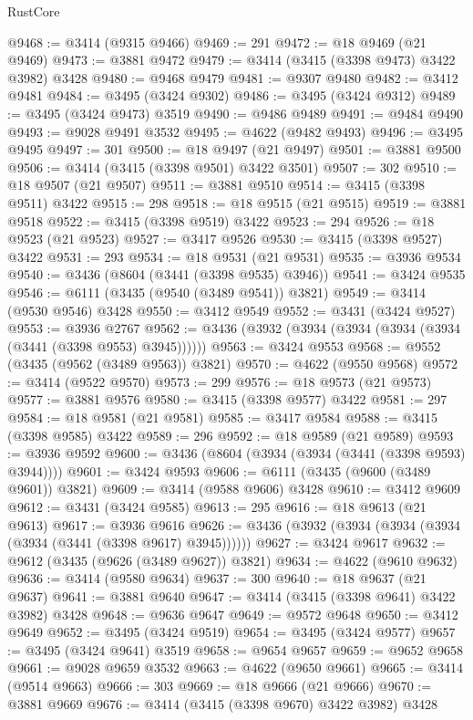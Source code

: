 \begin{lexlean}{RustCore}
\begin{coremodule}
@9468 := @3414 (@9315 @9466)
@9469 := 291
@9472 := @18 @9469 (@21 @9469)
@9473 := @3881 @9472
@9479 := @3414 (@3415 (@3398 @9473) @3422 @3982) @3428
@9480 := @9468 @9479
@9481 := @9307 @9480
@9482 := @3412 @9481
@9484 := @3495 (@3424 @9302)
@9486 := @3495 (@3424 @9312)
@9489 := @3495 (@3424 @9473) @3519
@9490 := @9486 @9489
@9491 := @9484 @9490
@9493 := @9028 @9491 @3532
@9495 := @4622 (@9482 @9493)
@9496 := @3495 @9495
@9497 := 301
@9500 := @18 @9497 (@21 @9497)
@9501 := @3881 @9500
@9506 := @3414 (@3415 (@3398 @9501) @3422 @3501)
@9507 := 302
@9510 := @18 @9507 (@21 @9507)
@9511 := @3881 @9510
@9514 := @3415 (@3398 @9511) @3422
@9515 := 298
@9518 := @18 @9515 (@21 @9515)
@9519 := @3881 @9518
@9522 := @3415 (@3398 @9519) @3422
@9523 := 294
@9526 := @18 @9523 (@21 @9523)
@9527 := @3417 @9526
@9530 := @3415 (@3398 @9527) @3422
@9531 := 293
@9534 := @18 @9531 (@21 @9531)
@9535 := @3936 @9534
@9540 := @3436 (@8604 (@3441 (@3398 @9535) @3946))
@9541 := @3424 @9535
@9546 := @6111 (@3435 (@9540 (@3489 @9541)) @3821)
@9549 := @3414 (@9530 @9546) @3428
@9550 := @3412 @9549
@9552 := @3431 (@3424 @9527)
@9553 := @3936 @2767
@9562 := @3436 (@3932 (@3934 (@3934 (@3934 (@3934 (@3441 (@3398 @9553) @3945))))))
@9563 := @3424 @9553
@9568 := @9552 (@3435 (@9562 (@3489 @9563)) @3821)
@9570 := @4622 (@9550 @9568)
@9572 := @3414 (@9522 @9570)
@9573 := 299
@9576 := @18 @9573 (@21 @9573)
@9577 := @3881 @9576
@9580 := @3415 (@3398 @9577) @3422
@9581 := 297
@9584 := @18 @9581 (@21 @9581)
@9585 := @3417 @9584
@9588 := @3415 (@3398 @9585) @3422
@9589 := 296
@9592 := @18 @9589 (@21 @9589)
@9593 := @3936 @9592
@9600 := @3436 (@8604 (@3934 (@3934 (@3441 (@3398 @9593) @3944))))
@9601 := @3424 @9593
@9606 := @6111 (@3435 (@9600 (@3489 @9601)) @3821)
@9609 := @3414 (@9588 @9606) @3428
@9610 := @3412 @9609
@9612 := @3431 (@3424 @9585)
@9613 := 295
@9616 := @18 @9613 (@21 @9613)
@9617 := @3936 @9616
@9626 := @3436 (@3932 (@3934 (@3934 (@3934 (@3934 (@3441 (@3398 @9617) @3945))))))
@9627 := @3424 @9617
@9632 := @9612 (@3435 (@9626 (@3489 @9627)) @3821)
@9634 := @4622 (@9610 @9632)
@9636 := @3414 (@9580 @9634)
@9637 := 300
@9640 := @18 @9637 (@21 @9637)
@9641 := @3881 @9640
@9647 := @3414 (@3415 (@3398 @9641) @3422 @3982) @3428
@9648 := @9636 @9647
@9649 := @9572 @9648
@9650 := @3412 @9649
@9652 := @3495 (@3424 @9519)
@9654 := @3495 (@3424 @9577)
@9657 := @3495 (@3424 @9641) @3519
@9658 := @9654 @9657
@9659 := @9652 @9658
@9661 := @9028 @9659 @3532
@9663 := @4622 (@9650 @9661)
@9665 := @3414 (@9514 @9663)
@9666 := 303
@9669 := @18 @9666 (@21 @9666)
@9670 := @3881 @9669
@9676 := @3414 (@3415 (@3398 @9670) @3422 @3982) @3428

\end{coremodule}
\end{lexlean}
